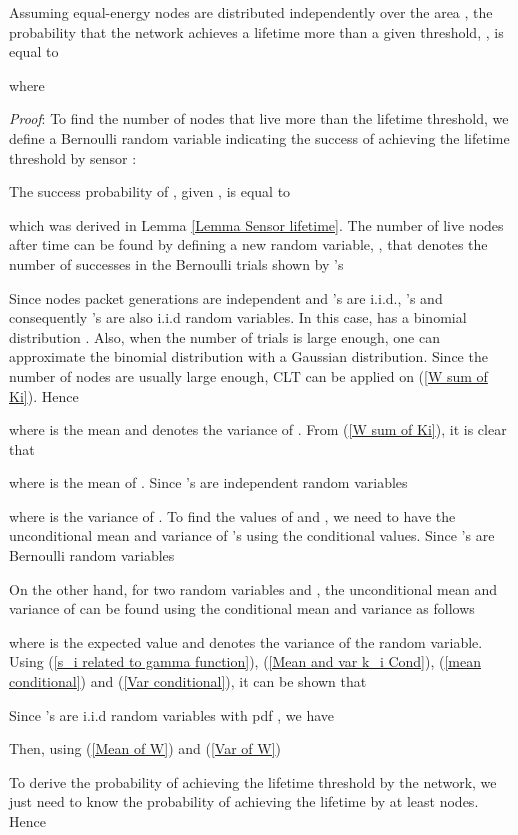 \documentclass[conference]{IEEEtran}
\begin{document}
\theo\label{Lifetime theorem} Assuming  equal-energy nodes are
distributed independently over the area , the probability
that the network achieves a lifetime more than a given threshold,
, is equal to

where


\textit{Proof}: To find the number of nodes that live more than the
lifetime threshold, we define a Bernoulli random variable 
indicating the success of achieving the lifetime threshold by sensor
:

The success probability of , given , is equal to

which was derived in Lemma \ref{Lemma Sensor lifetime}. The number
of live nodes after time  can be found by defining a new
random variable, , that denotes the number of successes in the
Bernoulli trials shown by 's

Since nodes packet generations are independent and 's are
i.i.d., 's and consequently 's are also i.i.d random
variables. In this case,  has a binomial distribution
\cite{Nedleman_Bernoulli_Statistician}. Also, when the number of
trials is large enough, one can approximate the binomial
distribution with a Gaussian distribution. Since the number of nodes
are usually large enough, CLT can be applied on (\ref{W sum of Ki}).
Hence

where  is the mean and  denotes the variance of
. From (\ref{W sum of Ki}), it is clear that

where  is the mean of . Since 's are
independent random variables

where  is the variance of . To find the values
of  and , we need to have the unconditional mean
and variance of 's using the conditional values. Since 's
are Bernoulli random variables

On the other hand, for two random variables  and , the
unconditional mean and variance of  can be found using the
conditional mean and variance as follows \cite{Ross_Prob}

where  is the expected value and 
denotes the variance of the random variable. Using (\ref{s_i related
to gamma function}), (\ref{Mean and var k_i Cond}), (\ref{mean
conditional}) and (\ref{Var conditional}), it can be shown that

Since 's are i.i.d random variables with pdf , we have

Then, using (\ref{Mean of W}) and (\ref{Var of W})


To derive the probability of achieving the lifetime threshold by the
network, we just need to know the probability of achieving the
lifetime by at least  nodes. Hence
\end{document}
